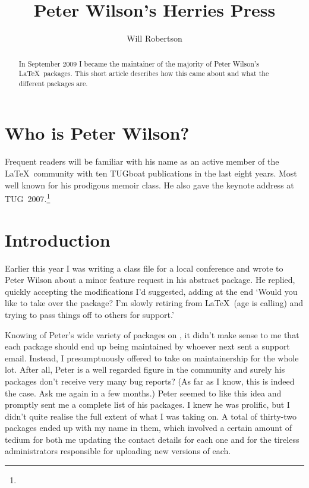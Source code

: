 \documentclass{ltugboat}
\title{Peter Wilson's Herries Press}
\author{Will Robertson}
\begin{document}
\maketitle
\begin{abstract}
In September 2009 I became the maintainer of the majority of Peter Wilson's \LaTeX\ packages. This short article describes how this came about and what the different packages are.
\end{abstract}

\section{Who is Peter Wilson?}

Frequent readers will be familiar with his name as an active member of the \LaTeX\ community with ten TUGboat publications in the last eight years. Most well known for his prodigous \textsf{memoir} class. He also gave the keynote address at TUG~2007.\footnote{}

\section{Introduction}

Earlier this year I was writing a class file for a local conference and wrote to Peter Wilson about a minor feature request in his \textsf{abstract} package. He replied, quickly accepting the modifications I'd suggested, adding at the end `{Would you like to take over the package? I'm slowly retiring from \LaTeX\ (age is calling) and trying to pass things off to others for support.}'

Knowing of Peter's wide variety of packages on , it didn't make sense to me that each package should end up being maintained by whoever next sent a support email. Instead, I presumptuously offered to take on maintainership for the whole lot. After all, Peter is a well regarded figure in the community and surely his packages don't receive very many bug reports? (As far as I know, this is indeed the case. Ask me again in a few months.) Peter seemed to like this idea and promptly sent me a complete list of his packages. I knew he was prolific, but I didn't quite realise the full extent of what I was taking on. A total of thirty-two packages ended up with my name in them, which involved a certain amount of tedium for both me updating the contact details for each one and for the tireless  administrators responsible for uploading new versions of each.
\end{document}
